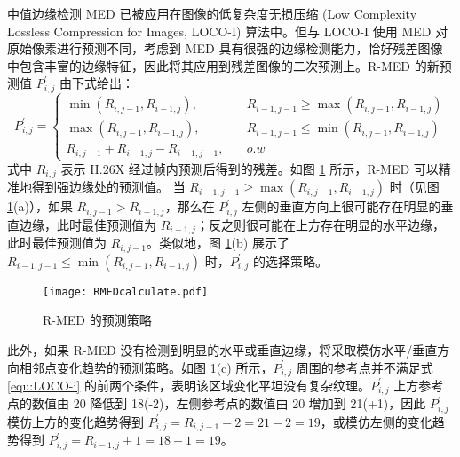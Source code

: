 中值边缘检测 MED 已被应用在图像的低复杂度无损压缩 (Low Complexity Lossless Compression for Images, LOCO-I) 算法中。但与 LOCO-I 使用 MED 对原始像素进行预测不同，考虑到 MED 具有很强的边缘检测能力，恰好残差图像中包含丰富的边缘特征，因此将其应用到残差图像的二次预测上。R-MED 的新预测值 $P_{i,j}^{'}$ 由下式给出：
\begin{equation}
    P_{i,j}^{'}=\left\{
    \begin{aligned}
        \min(R_{i,j-1},R_{i-1,j}), \quad       & R_{i-1,j-1} \geqslant \max(R_{i,j-1},R_{i-1,j}) \\
        \max(R_{i,j-1},R_{i-1,j}), \quad       & R_{i-1,j-1} \leqslant \min(R_{i,j-1},R_{i-1,j}) \\
        R_{i,j-1}+R_{i-1,j}-R_{i-1,j-1}, \quad & o.w
    \end{aligned}
    \right.
    \label{equ:LOCO-i}
\end{equation}
式中 $R_{i,j}$ 表示 H.26X 经过帧内预测后得到的残差。如图 \ref{fig:RMEDcalculate} 所示，R-MED 可以精准地得到强边缘处的预测值。
当 $R_{i-1,j-1} \geqslant \max(R_{i,j-1},R_{i-1,j})$ 时（见图 \ref{fig:RMEDcalculate}(a)），如果 $R_{i,j-1}>R_{i-1,j}$，那么在 $P_{i,j}^{'}$ 左侧的垂直方向上很可能存在明显的垂直边缘，此时最佳预测值为 $R_{i-1,j}$；反之则很可能在上方存在明显的水平边缘，此时最佳预测值为 $R_{i,j-1}$。类似地，图 \ref{fig:RMEDcalculate}(b) 展示了 $R_{i-1,j-1} \leqslant \min(R_{i,j-1},R_{i-1,j})$ 时，$P_{i,j}^{'}$ 的选择策略。
\begin{figure}[hbt]
    \centering
    \texttt{[image: RMEDcalculate.pdf]}
    \caption{R-MED 的预测策略}
    \label{fig:RMEDcalculate}
\end{figure}

此外，如果 R-MED 没有检测到明显的水平或垂直边缘，将采取模仿水平/垂直方向相邻点变化趋势的预测策略。如图 \ref{fig:RMEDcalculate}(c) 所示，$P_{i,j}^{'}$ 周围的参考点并不满足式 \ref{equ:LOCO-i} 的前两个条件，表明该区域变化平坦没有复杂纹理。$P_{i,j}^{'}$ 上方参考点的数值由 20 降低到 18(-2)，左侧参考点的数值由 20 增加到 21(+1)，因此 $P_{i,j}^{'}$ 模仿上方的变化趋势得到 $P_{i,j}^{'}=R_{i,j-1}-2=21-2=19$，或模仿左侧的变化趋势得到 $P_{i,j}^{'}=R_{i-1,j}+1=18+1=19$。

